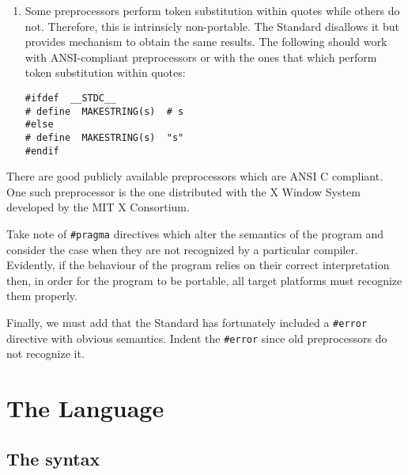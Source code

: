 \begin{enumerate}
\begin{verbatim}
#ifdef  __STDC__
# define  GLUE(a,b)  a##b
#else
# define  GLUE(a,b)  a/**/b
#endif
\end{verbatim}

 If needed, one could define similar macros to {\tt GLUE} several arguments
\footnote{{\tt GLUE(a,GLUE(b,c))} would not result in the concatenation
 of {\tt a, b,} and {\tt c}.}.

\item Some preprocessors perform token substitution within quotes while others
 do not. Therefore, this is intrinsicly non-portable. The Standard
 disallows it but provides mechanism to obtain the same results. The
 following should work with ANSI-compliant preprocessors or with the
 ones that which perform token substitution within quotes:

\begin{verbatim}
#ifdef  __STDC__
# define  MAKESTRING(s)  # s
#else
# define  MAKESTRING(s)  "s"
#endif
\end{verbatim}

\end{enumerate}

There are good publicly available preprocessors which are ANSI C compliant.
One such preprocessor is the one distributed with the X
Window System developed by the MIT X Consortium.

Take note of {\tt \#pragma} directives which
alter the semantics of the program and consider the case when they
are not recognized by a particular compiler. Evidently,
if the behaviour of the program relies on their correct interpretation
then, in order for the program to be portable, all target platforms
must recognize them properly.

Finally, we must add that the Standard has fortunately included
a {\tt \#error} directive with obvious semantics. Indent the {\tt \#error}
since old preprocessors do not recognize it.

\section{The Language}

\subsection{The syntax}

